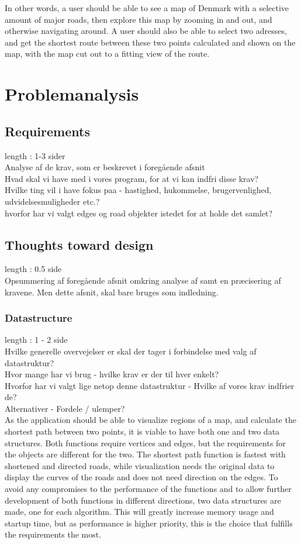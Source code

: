 \documentclass[a4paper,10pt,titlepage]{article}
\begin{document}
		In other words, a user should be able to see a map of Denmark with a selective amount of major roads, then explore
		 this map by zooming in and out, and otherwise navigating around. A user should also be able to select two adresses,
		 and get the shortest route between these two points calculated and shown on the map, with the map cut out to a
		 fitting view of the route.
	\section{Problemanalysis}
		\subsection{Requirements}
		length : 1-3 sider\\
		Analyse af de krav, som er beskrevet i foregående afsnit\\
		Hvad skal vi have med i vores program, for at vi kan indfri disse krav?\\
		Hvilke ting vil i have fokus paa - hastighed, hukommelse, brugervenlighed, udvidelsesmuligheder etc.?\\
		hvorfor har vi valgt edges og road objekter istedet for at holde det samlet?
		
		
		\subsection{Thoughts toward design}
			length : 0.5 side\\
			Opsummering af foregående afsnit omkring analyse af samt en præcisering af kravene. Men dette afsnit, skal bare bruges som indledning. 
			\subsubsection{Datastructure}
				length : 1 - 2 side\\
				Hvilke generelle overvejelser er skal der tager i forbindelse med valg af datastruktur? \\
				Hvor mange har vi brug - hvilke krav er der til hver enkelt?\\
				Hvorfor har vi valgt lige netop denne datastruktur - Hvilke af vores krav indfrier de?\\
				Alternativer - Fordele / ulemper?\\

				As the application should be able to visualize regions of a map, and calculate the shortest path between two points, it is viable to have both one and two data structures. Both functions require vertices and edges, but the requirements for the objects are different for the two. The shortest path function is fastest with shortened and directed roads, while visualization needs the original data to display the curves of the roads and does not need direction on the edges. To avoid any compromises to the performance of the functions and to allow further development of both functions in different directions, two data structures are made, one for each algorithm. This will greatly increase memory usage and startup time, but as performance is higher priority, this is the choice that fulfills the requirements the most.
\end{document}
